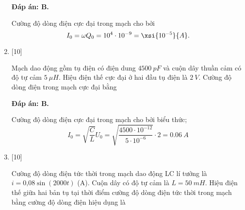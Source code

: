 \begin{enumerate}[label=\bfseries Câu \arabic*:]
	\loigiai
	{		\textbf{Đáp án: B.}
		
Cường độ dòng điện cực đại trong mạch cho bởi
$$
I_{0}=\omega Q_{0}=10^{4} \cdot 10^{-9}= \xsi{10^{-5}}{A}.
$$
		
	}

	\item {} [10]
	
	\cauhoi
	{Mạch dao động gồm tụ điện có điện dung $\SI{4500}{pF}$ và cuộn dây thuần cảm có độ tự cảm $\SI{5}{\mu H}$. Hiệu điện thế cực đại ở hai đầu tụ điện là $\SI{2}{V}$. Cường độ dòng điện trong mạch cực đại bằng
	}
	
	\loigiai
	{		\textbf{Đáp án: B.}
		
Cường độ dòng điện cực đại trong mạch cho bởi biểu thức;
$$
I_{0}=\sqrt{\dfrac{C}{L}} U_{0}=\sqrt{\dfrac{4500\cdot10^{-12}}{5\cdot10^{-6}}} \cdot 2=\SI{0,06}{A}
$$
		
	}

	\item {} [10]
	
	\cauhoi
	{Cường độ dòng điện tức thời trong mạch dao động LC lí tưởng là $i = \text{0,08} \sin \left( 2000t \right)$ (A). Cuộn dây có độ tự cảm là $L = \SI{50}{mH}$. Hiệu điện thế giữa hai bản tụ tại thời điểm cường độ dòng điện tức thời trong mạch bằng cường độ dòng điện hiệu dụng là
	}
	

\end{enumerate}

